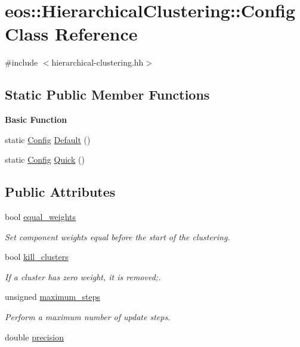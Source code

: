 \hypertarget{classeos_1_1HierarchicalClustering_1_1Config}{
\section{eos::HierarchicalClustering::Config Class Reference}
\label{classeos_1_1HierarchicalClustering_1_1Config}
}


{\ttfamily \#include $<$hierarchical-\/clustering.hh$>$}\subsection*{Static Public Member Functions}
\begin{Indent}{\bf Basic Function}\par
{\em \label{_amgrp9ac0a05bc9f1ecee9a728c52951f9f43}
 }\begin{DoxyCompactItemize}
\item 
static \hyperlink{classeos_1_1HierarchicalClustering_1_1Config}{Config} \hyperlink{classeos_1_1HierarchicalClustering_1_1Config_ab3a9f56ddac58bb2555732aca6826c55}{Default} ()
\item 
static \hyperlink{classeos_1_1HierarchicalClustering_1_1Config}{Config} \hyperlink{classeos_1_1HierarchicalClustering_1_1Config_a44043dd972ada7b67359a5e715d8555e}{Quick} ()
\end{DoxyCompactItemize}
\end{Indent}
\subsection*{Public Attributes}
\begin{DoxyCompactItemize}
\item 
bool \hyperlink{classeos_1_1HierarchicalClustering_1_1Config_afb6c81886f8c7fc9618cc469b51dfd91}{equal\_\-weights}
\begin{DoxyCompactList}\small\item\em Set component weights equal before the start of the clustering. \item\end{DoxyCompactList}\item 
bool \hyperlink{classeos_1_1HierarchicalClustering_1_1Config_aef80452710fbd5dfab29150cd26790ee}{kill\_\-clusters}
\begin{DoxyCompactList}\small\item\em If a cluster has zero weight, it is removed;. \item\end{DoxyCompactList}\item 
unsigned \hyperlink{classeos_1_1HierarchicalClustering_1_1Config_af5c0aa9ab025297407497a246ac613ee}{maximum\_\-steps}
\begin{DoxyCompactList}\small\item\em Perform a maximum number of update steps. \item\end{DoxyCompactList}\item 
double \hyperlink{classeos_1_1HierarchicalClustering_1_1Config_a4982011f9ceceaf71ade5e018072abf6}{precision}
\end{DoxyCompactItemize}



